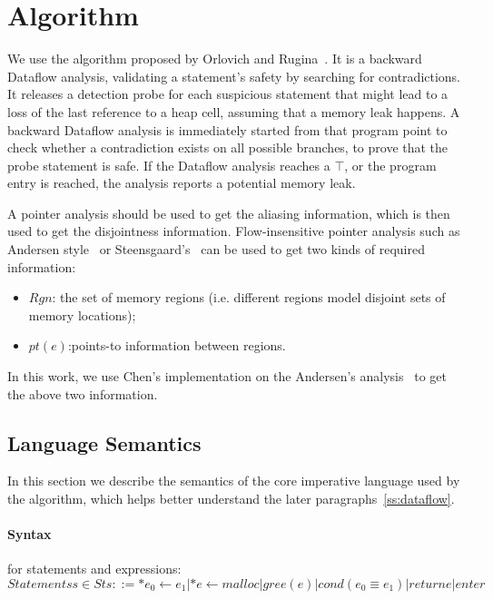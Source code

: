 \section{Algorithm}
\label{s:algorithm}

We use the algorithm proposed by Orlovich and Rugina~\cite{rugina}. It is a 
backward Dataflow analysis, validating a statement's safety by searching for 
contradictions. It releases a detection probe for each suspicious statement 
that might lead to a loss of the last reference to a heap cell, assuming that 
a memory leak happens. A backward Dataflow analysis is immediately started from
that program point to check whether a contradiction exists on all possible 
branches, to prove that the probe statement is safe. If the Dataflow analysis 
reaches a $\top$, or the program entry is reached, the analysis reports a 
potential memory leak.

A pointer analysis should be used to get the aliasing information, 
which is then used to get the disjointness information. Flow-insensitive 
pointer analysis such as Andersen style~\cite{andersen} or 
Steensgaard's~\cite{steensgaard} can be used to get two kinds of required 
information:

\begin{itemize}
  \item $Rgn$: the set of memory regions 
    (i.e. different regions model disjoint sets of memory locations);
  \item $pt(e)$:points-to information between regions.
\end{itemize}

In this work, we use Chen's implementation on the Andersen's 
analysis~\cite{chen} to get the above two information.


\subsection{Language Semantics}
\label{ss:semantics}

In this section we describe the semantics of the core imperative language 
used by the algorithm, which helps better understand the later 
paragraphs~\ref{ss:dataflow}.

\paragraph{Syntax} for statements and expressions: \\

$Statements s\in St s::= *e_0\gets e_1 | *e\gets malloc | gree(e) | 
cond(e_0\equiv e_1) | return e | enter$ \\

